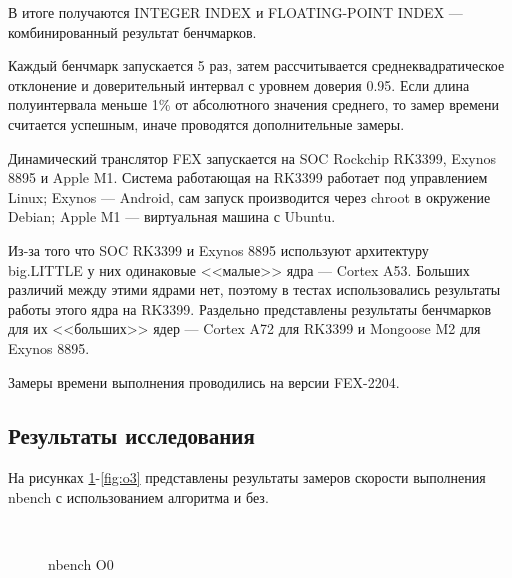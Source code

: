 В итоге получаются INTEGER INDEX и FLOATING-POINT INDEX --- комбинированный результат бенчмарков.

Каждый бенчмарк запускается 5 раз, затем рассчитывается среднеквадратическое отклонение и доверительный интервал с уровнем доверия 0.95. Если длина полуинтервала меньше 1\% от абсолютного значения среднего, то замер времени считается успешным, иначе проводятся дополнительные замеры.

Динамический транслятор FEX запускается на SOC Rockchip RK3399, Exynos 8895 и Apple M1. Система работающая на RK3399 работает под управлением Linux; Exynos --- Android, сам запуск производится через chroot в окружение Debian; Apple M1 --- виртуальная машина с Ubuntu.

Из-за того что SOC RK3399 и Exynos 8895 используют архитектуру \\ big.LITTLE у них одинаковые <<малые>> ядра --- Cortex A53. Больших различий между этими ядрами нет, поэтому в тестах использовались результаты работы этого ядра на RK3399. Раздельно представлены результаты бенчмарков для их <<больших>> ядер --- Cortex A72 для RK3399 и Mongoose M2 для Exynos 8895.

Замеры времени выполнения проводились на версии FEX-2204.

\subsection{Результаты исследования}

На рисунках \ref{fig:o0}-\ref{fig:o3} представлены результаты замеров скорости выполнения nbench с использованием алгоритма и без.

\begin{figure}[hbtp]
	\centering
	\\
	\caption{nbench O0}
	\label{fig:o0}
\end{figure}


